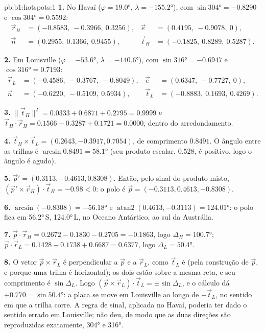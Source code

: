 \begin{solution}{pb:b1:hotspots:1}
\textbf{1.} No Havaí ($\varphi = \ang{19.0}$, $\lambda = \ang{-155.2}$),
com $\sin\ang{304} = -0.8290$ e $\cos\ang{304} = 0.5592$:
\[
\begin{aligned}
  \vec r_H &= (-0.8583,\ -0.3966,\ 0.3256), &
  \vec e &= (0.4195,\ -0.9078,\ 0),\\
  \vec n &= (0.2955,\ 0.1366,\ 0.9455), &
  \vec t_H &= (-0.1825,\ 0.8289,\ 0.5287).
\end{aligned}
\]

\textbf{2.} Em Louisville ($\varphi = \ang{-53.6}$, $\lambda = \ang{-140.6}$),
com $\sin\ang{316} = -0.6947$ e $\cos\ang{316} = 0.7193$:
\[
\begin{aligned}
  \vec r_L &= (-0.4586,\ -0.3767,\ -0.8049), &
  \vec e &= (0.6347,\ -0.7727,\ 0),\\
  \vec n &= (-0.6220,\ -0.5109,\ 0.5934), &
  \vec t_L &= (-0.8883,\ 0.1693,\ 0.4269).
\end{aligned}
\]

\textbf{3.} $\lVert\vec t_H\rVert^2 = 0.0333 + 0.6871 + 0.2795 = 0.9999$ e
$\vec t_H\cdot\vec r_H = 0.1566 - 0.3287 + 0.1721 = 0.0000$, dentro do arredondamento.

\textbf{4.} $\vec t_H\times\vec t_L = (0.2643, -0.3917, 0.7054)$, de comprimento
$0.8491$. O ângulo entre as trilhas é $\arcsin0.8491 = \ang{58.1}$ (seu produto escalar, $0.528$, é positivo, logo o ângulo é agudo).

\textbf{5.} $\vec p' = (0.3113, -0.4613, 0.8308)$. Então, pelo sinal do produto misto,
$(\vec p'\times\vec r_H)\cdot\vec t_H = -0.98 < 0$: o polo é
$\vec p = (-0.3113, 0.4613, -0.8308)$.

\textbf{6.} $\arcsin(-0.8308) = \ang{-56.18}$ e
$\operatorname{atan2}(0.4613, -0.3113) = \ang{124.01}$: o polo fica em
\ang{56.2}\,S, \ang{124.0}\,L, no Oceano Antártico, ao sul da Austrália.

\textbf{7.} $\vec p\cdot\vec r_H = 0.2672 - 0.1830 - 0.2705 = -0.1863$, logo
$\Delta_H = \ang{100.7}$; $\vec p\cdot\vec r_L = 0.1428 - 0.1738 + 0.6687 =
0.6377$, logo $\Delta_L = \ang{50.4}$.

\textbf{8.} O vetor $\vec p\times\vec r_L$ é perpendicular a $\vec p$ e a
$\vec r_L$, como $\vec t_L$ é (pela construção de $\vec p$, e porque uma trilha é horizontal); os dois estão sobre a mesma reta, e seu comprimento é
$\sin\Delta_L$. Logo $(\vec p\times\vec r_L)\cdot\vec t_L = \pm\sin\Delta_L$, e o cálculo dá $+0.770 = \sin\ang{50.4}$: a placa se move em Louisville ao longo de $+\vec t_L$, no sentido em que a trilha corre. A regra de sinal, aplicada no Havaí, poderia ter dado o sentido errado em Louisville; não deu, de modo que as duas direções são reproduzidas exatamente, \ang{304} e \ang{316}.


\end{solution}
